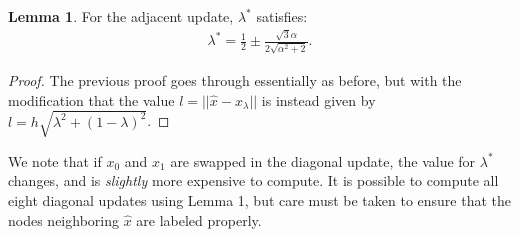 \documentclass{article}
\theoremstyle{definition}
\newtheorem{lemma}{Lemma}
\begin{document}
\begin{lemma}
  For the adjacent update, $\lambda^*$ satisfies:
  \begin{align*}
    \lambda^* = \frac{1}{2} \pm \frac{\sqrt{3} \alpha}{2 \sqrt{\alpha^2 + 2}}.
  \end{align*}
\end{lemma}

\begin{proof}
  The previous proof goes through essentially as before, but with the
  modification that the value $l = ||\hat{x} - x_\lambda||$ is instead
  given by $l = h \sqrt{\lambda^2 + (1 - \lambda)^2}$.
\end{proof}

We note that if $x_0$ and $x_1$ are swapped in the diagonal update,
the value for $\lambda^*$ changes, and is \emph{slightly} more
expensive to compute. It is possible to compute all eight diagonal
updates using Lemma 1, but care must be taken to ensure that the nodes
neighboring $\hat{x}$ are labeled properly.
\end{document}
